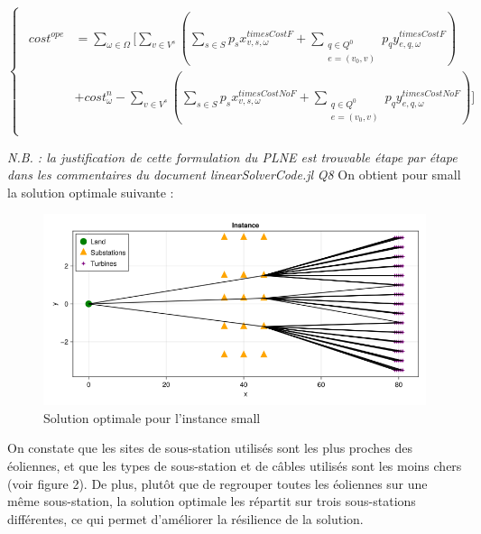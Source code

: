 \documentclass[a4paper,12pt]{article}
\begin{document}
    \begin{equation}
        \begin{cases}
            \begin{alignedat}{2}
                 cost^{ope} &= \sum_{\omega \in \Omega} \lbrack \sum_{v \in V^s} ( \sum_{s \in S} p_s x_{v,s,\omega}^{timesCostF} + \sum_{\substack{q \in Q^0 \\ e = (v_0, v)}} p_q y_{e,q,\omega}^{timesCostF} ) \\
                &+ cost^n_{\omega} - \sum_{v \in V^s} ( \sum_{s \in S} p_s x_{v,s,\omega}^{timesCostNoF} + \sum_{\substack{q \in Q^0 \\ e = (v_0, v)}} p_q y_{e,q,\omega}^{timesCostNoF} ) \rbrack \\ 
                 
            \end{alignedat}
        \end{cases}
    \end{equation}

    \textit{N.B. : la justification de cette formulation du PLNE est trouvable étape par étape dans les commentaires du document linearSolverCode.jl}
\textit{Q8}
On obtient pour small la solution optimale suivante :

\begin{figure}[h]
    \centering
    \includegraphics[scale=0.3]{small.png}
    \caption{Solution optimale pour l'instance small}
\end{figure}

On constate que les sites de sous-station utilisés sont les plus proches des éoliennes, et que les types de sous-station et de câbles utilisés sont les moins chers (voir figure 2).
De plus, plutôt que de regrouper toutes les éoliennes sur une même sous-station, la solution optimale les répartit sur trois sous-stations différentes, ce qui permet d'améliorer la résilience de la solution.
\end{document}
